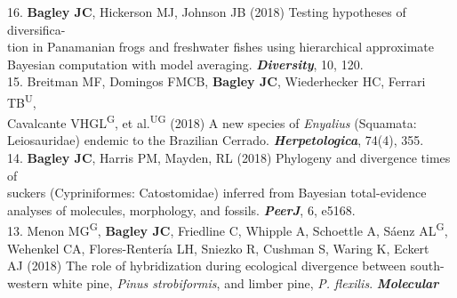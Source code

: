 \documentclass[margin,line]{res}
\begin{document}
\begin{resume}
16. \textbf{Bagley JC}, Hickerson MJ, Johnson JB (2018) Testing hypotheses of diversifica-\\
\hspace*{8mm} tion in Panamanian frogs and freshwater fishes using hierarchical approximate\\ \vspace{2mm}
\hspace*{8mm}Bayesian computation with model averaging. {\it \textbf{Diversity}}, 10, 120. \\
15. Breitman MF, Domingos FMCB, \textbf{Bagley JC}, Wiederhecker HC, Ferrari TB\textsuperscript{U},\\ 
\hspace*{8mm} Cavalcante VHGL\textsuperscript{G}, et al.\textsuperscript{UG} (2018) A new species of \emph{Enyalius} (Squamata:\\ \vspace{2mm}
\hspace*{8mm}Leiosauridae) endemic to the Brazilian Cerrado. {\it \textbf{Herpetologica}}, 74(4), 355. \\
14. \textbf{Bagley JC}, Harris PM, Mayden, RL (2018) Phylogeny and divergence times of\\
\hspace*{8mm} suckers (Cypriniformes: Catostomidae) inferred from Bayesian total-evidence\\ \vspace{2mm}
\hspace*{8mm}analyses of molecules, morphology, and fossils. {\it \textbf{PeerJ}}, 6, e5168. \\ %
13. Menon MG\textsuperscript{G}, \textbf{Bagley JC}, Friedline C, Whipple A, Schoettle A, S\'{a}enz AL\textsuperscript{G},\\ 
\hspace*{8mm} Wehenkel CA, Flores-Renter\'{i}a LH, Sniezko R, Cushman S, Waring K, Eckert\\
\hspace*{8mm} AJ (2018) The role of hybridization during ecological divergence between south-\\
\hspace*{8mm} western white pine, {\it Pinus strobiformis}, and limber pine, {\it P. flexilis}. {\it \textbf{Molecular}\\ \vspace{2mm}
}
\end{resume}
\end{document}
